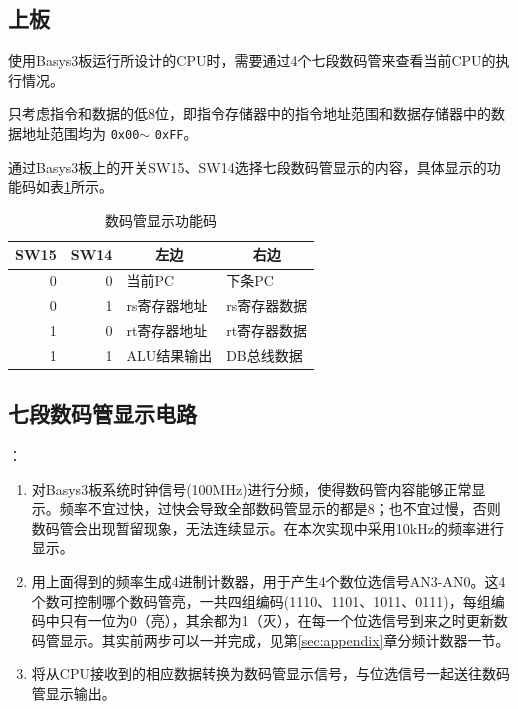 
\subsection{上板}
\qquad 使用Basys3板运行所设计的CPU时，需要通过4个七段数码管来查看当前CPU的执行情况。
\par 只考虑指令和数据的低8位，即指令存储器中的指令地址范围和数据存储器中的数据地址范围均为 \verb'0x00'$\sim$ \verb'0xFF'。
\par 通过Basys3板上的开关SW15、SW14选择七段数码管显示的内容，具体显示的功能码如表\ref{tab:seg_code}所示。
\begin{table}[htbp]
  \centering\wuhao
  \caption{数码管显示功能码}
    \begin{tabular}{|r|r|l|l|}
    \hline
    \multicolumn{1}{|c|}{SW15} & \multicolumn{1}{c|}{SW14} & \multicolumn{1}{c|}{左边} & \multicolumn{1}{c|}{右边} \bigstrut\\
    \hline
    0     & 0     & 当前PC  & 下条PC \bigstrut\\
    \hline
    0     & 1     & rs寄存器地址 & rs寄存器数据 \bigstrut\\
    \hline
    1     & 0     & rt寄存器地址 & rt寄存器数据 \bigstrut\\
    \hline
    1     & 1     & ALU结果输出 & DB总线数据 \bigstrut\\
    \hline
    \end{tabular}%
  \label{tab:seg_code}%
\end{table}%

\subsection{七段数码管显示电路}
：
\begin{enumerate}
    \item 对Basys3板系统时钟信号(100MHz)进行分频，使得数码管内容能够正常显示。频率不宜过快，过快会导致全部数码管显示的都是8；也不宜过慢，否则数码管会出现暂留现象，无法连续显示。在本次实现中采用10kHz的频率进行显示。
    \item 用上面得到的频率生成4进制计数器，用于产生4个数位选信号AN3-AN0。这4个数可控制哪个数码管亮，一共四组编码(1110、1101、1011、0111)，每组编码中只有一位为0（亮），其余都为1（灭），在每一个位选信号到来之时更新数码管显示。其实前两步可以一并完成，见第\ref{sec:appendix}章分频计数器一节。
    \item 将从CPU接收到的相应数据转换为数码管显示信号，与位选信号一起送往数码管显示输出。
\end{enumerate}

